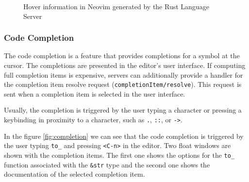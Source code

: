 \begin{figure}[t]
    \centering
    \caption{Hover information in Neovim generated by the Rust Language Server}
    \label{fig:hover}
\end{figure}

\subsubsection{Code Completion}
\hfill \break

The code completion is a feature that provides completions for a symbol at the cursor. The completions are presented in the editor's user interface. If computing full completion items is expensive, servers can additionally provide a handler for the completion item resolve request (\texttt{completionItem/resolve}). This request is sent when a completion item is selected in the user interface.

Usually, the completion is triggered by the user typing a character or pressing a keybinding in proximity to a character, such as \texttt{.}, \texttt{::}, or \texttt{->}.

In the figure \ref{fig:completion} we can see that the code completion is triggered by the user typing \texttt{to\_} and pressing \texttt{<C-n>} in the editor. Two float windows are shown with the completion items. The first one shows the options for the \texttt{to\_} function associated with the \texttt{\&str} type and the second one shows the documentation of the selected completion item.

